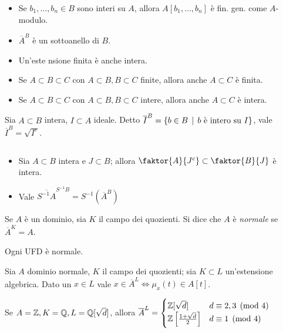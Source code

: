 \begin{proposition}$ $
    \begin{itemize}
        \item Se $b_1,\dots, b_n\in B$ sono interi su $A$, allora $A[b_1,\dots,b_n]$ è fin. gen. come $A$-modulo.
        \item $\overline{A}^B$ è un sottoanello di $B$.
        \item Un'este  nsione finita è anche intera.
        \item Se $A\subset B\subset C$ con $A\subset B, B\subset C$ finite, allora anche $A\subset C$ è finita.
        \item Se $A\subset B\subset C$ con $A\subset B, B\subset C$ intere, allora anche $A\subset C$ è intera.
    \end{itemize}
\end{proposition}

\begin{lemma}
    Sia $A\subset B$ intera, $I\subset A$ ideale. Detto $\overline{I}^B=\{ b\in B \operatorname{\; |\;} b \text{ è intero su } I \}$, vale $\overline{I}^B = \sqrt{I^e}$.
\end{lemma}

\begin{proposition}$ $
    \begin{itemize}
        \item Sia $A\subset B$ intera e $J\subset B$; allora $\faktor{A}{J^c}\subset \faktor{B}{J}$ è intera.
        \item Vale $\overline{S^{-1}A}^{S^{-1}B}=S^{-1}(\overline{A}^B) $
    \end{itemize}
\end{proposition}

\begin{definition}
    Se $A$ è un dominio, sia $K$ il campo dei quozienti. Si dice che $A$ è \emph{normale} se $\overline{A}^K=A$.
\end{definition}

\begin{proposition}
    Ogni UFD è normale.
\end{proposition}

\begin{theorem}
    Sia $A$ dominio normale, $K$ il campo dei quozienti; sia $K\subset L$ un'estensione algebrica. Dato un $x\in L$ vale $x\in \overline{A}^L \iff \mu_x(t)\in A[t]$.
\end{theorem}

\begin{example}
    Se $A=\mathbb{Z}, K=\mathbb{Q}, L=\mathbb{Q}[\sqrt d]$, allora $\overline{A}^L=\begin{cases}
    \mathbb{Z}[\sqrt d] & d\equiv 2,3\pmod 4 \\
    \mathbb{Z}\left[ \frac{1+\sqrt d}{2} \right] & d\equiv 1\pmod 4
    \end{cases}$
\end{example}

